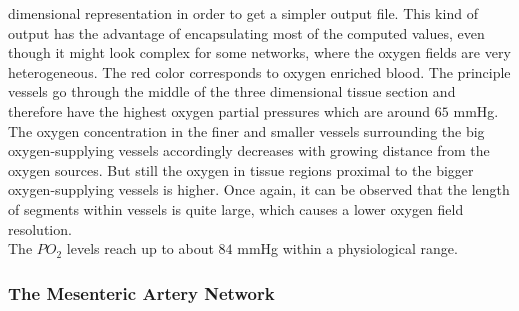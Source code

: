 dimensional representation in order to get a simpler output file. This kind of output has the advantage of encapsulating most of the computed values, even though it might look complex for some networks, where the oxygen fields are very heterogeneous. The red color corresponds to oxygen enriched blood. The principle vessels go through the middle of the three dimensional tissue section and therefore have the highest oxygen partial pressures which are around $65$ mmHg. The oxygen concentration in the finer and smaller vessels surrounding the big oxygen-supplying vessels accordingly decreases with growing distance from the oxygen sources.
But still the oxygen in tissue regions proximal to the bigger oxygen-supplying vessels is higher. Once again, it can be observed that the length of segments within vessels is quite large, which causes a lower oxygen field resolution.
\\The $PO_2$ levels reach up to about $84$ mmHg within a physiological range.

\newpage
\subsubsection*{The Mesenteric Artery Network}
\label{Mesent}

